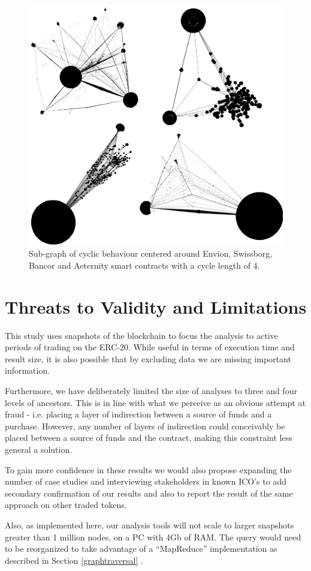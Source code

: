 \documentclass[conference]{IEEEtran}
\begin{document}
\begin{figure}
    \centering
    \includegraphics[width=0.5\columnwidth]{images/4icos.png}
    \caption{Sub-graph of cyclic behaviour centered around Envion, Swissborg, Bancor and Aeternity smart contracts with a cycle length of 4.}
    \label{fig:4icos}
\end{figure}


\section{Threats to Validity and Limitations}\label{sec:threats}
This study uses snapshots of the blockchain to focus the analysis to active periods of trading on the ERC-20. While useful in terms of execution time and result size, it is also possible that by excluding data we are missing important information.  

Furthermore, we have deliberately limited the size of analyses to three and four levels of ancestors.  This is in line with what we perceive as an obvious attempt at fraud - i.e. placing a layer of indirection between a source of funds and a purchase.  However, any number of layers of indirection could conceivably be placed between a source of funds and the contract, making this constraint less general a solution.

To gain more confidence in these results we would also propose expanding the number of case studies and interviewing stakeholders in known ICO's to add secondary confirmation of our results and also to report the result of the same approach on other traded tokens.

Also, as implemented here, our analysis tools will not scale to larger snapshots greater than 1 million nodes, on a PC with 4Gb of RAM.  The query would need to be reorganized to take advantage of a ``MapReduce'' implementation as described in Section \ref{graphtraversal} \cite{dean2008mapreduce}.
\end{document}
